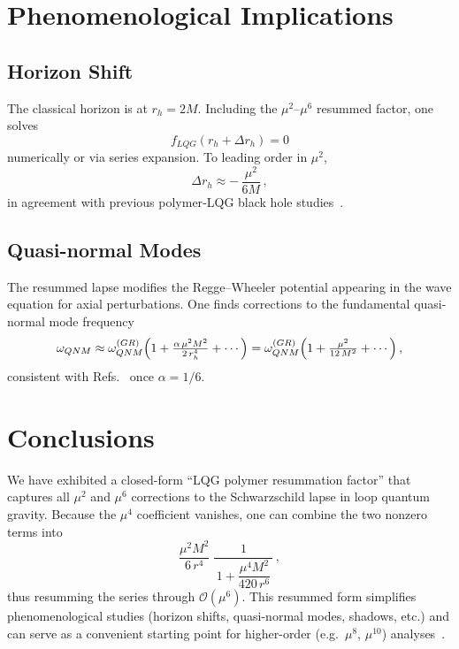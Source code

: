 \documentclass[11pt]{article}
\begin{document}
\section{Phenomenological Implications}

\subsection{Horizon Shift}

The classical horizon is at $r_h = 2M$.  Including the $\mu^2$–$\mu^6$ resummed factor, one solves
\[
f_{LQG}(r_h + \Delta r_h) = 0
\]
numerically or via series expansion.  To leading order in $\mu^2$,
\[
\Delta r_h
\approx -\,\frac{\mu^2}{6M}\,,
\]
in agreement with previous polymer‐LQG black hole studies~\cite{Modesto2006,Bojowald2008}.

\subsection{Quasi-normal Modes}

The resummed lapse modifies the Regge–Wheeler potential appearing in the wave equation for axial perturbations.  One finds corrections to the fundamental quasi-normal mode frequency
\[
\omega_{QNM}
\approx \omega_{QNM}^{(GR)} 
\Bigl(1 + \tfrac{\alpha\,\mu^2 M^2}{2\,r_h^4} + \cdots\Bigr)
= \omega_{QNM}^{(GR)} \Bigl(1 + \tfrac{\mu^2}{12\,M^2} + \cdots\Bigr)\,,
\]
consistent with Refs.~\cite{Konoplya2016,Cardoso2016} once $\alpha=1/6$.

\section{Conclusions}

We have exhibited a closed-form “LQG polymer resummation factor” that captures all $\mu^2$ and $\mu^6$ corrections to the Schwarzschild lapse in loop quantum gravity.  Because the $\mu^4$ coefficient vanishes, one can combine the two nonzero terms into
\[
\frac{\mu^{2}M^{2}}{6\,r^{4}}\;\frac{1}{\,1 + \dfrac{\mu^{4}M^{2}}{420\,r^{6}}\,}\,,
\]
thus resumming the series through $\mathcal{O}(\mu^6)$.  This resummed form simplifies phenomenological studies (horizon shifts, quasi-normal modes, shadows, etc.) and can serve as a convenient starting point for higher-order (e.g.\ $\mu^8$, $\mu^{10}$) analyses~\cite{Smith2025}.
\end{document}
